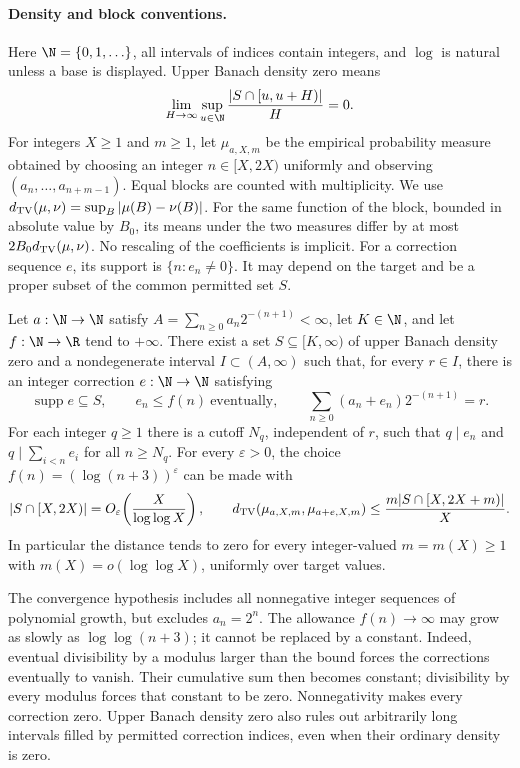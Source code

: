 \documentclass[11pt]{article}
\begin{document}
\paragraph{Density and block conventions.}
Here $\N=\{0,1,\ldots\}$, all intervals of indices contain integers, and
$\log$ is natural unless a base is displayed.  Upper Banach density zero means
\[
 \lim_{H\to\infty}\sup_{u\in\N}\frac{|S\cap[u,u+H)|}{H}=0.
\]
For integers $X\ge1$ and $m\ge1$, let $\mu_{a,X,m}$ be the empirical
probability measure obtained by choosing an integer $n\in[X,2X)$ uniformly
and observing $(a_n,\ldots,a_{n+m-1})$.  Equal blocks are counted with
multiplicity.
We use $d_{\rm TV}(\mu,\nu)=\sup_B|\mu(B)-\nu(B)|$.  For the same function
of the block, bounded in absolute value by $B_0$, its means under the two
measures differ by at most $2B_0d_{\rm TV}(\mu,\nu)$.
No rescaling of the coefficients is implicit.
For a correction sequence $e$, its support is $\{n:e_n\ne0\}$.
It may depend on the target and be a proper subset of the common permitted
set $S$.

\begin{proposition}\label{res:sparserationalisation}
Let $a:\N\to\N$ satisfy $A=\sum_{n\ge0}a_n2^{-(n+1)}<\infty$,
let $K\in\N$, and let $f:\N\to\R$ tend to $+\infty$.
There exist a set $S\subseteq[K,\infty)$ of upper Banach density zero
and a nondegenerate interval $I\subset(A,\infty)$ such that, for every
$r\in I$, there is an integer correction $e:\N\to\N$ satisfying
\[
 \operatorname{supp}e\subseteq S,\qquad e_n\le f(n)\ \text{eventually},
 \qquad \sum_{n\ge0}(a_n+e_n)2^{-(n+1)}=r.
\]
For each integer $q\ge1$ there is a cutoff $N_q$, independent of $r$,
such that $q\mid e_n$ and $q\mid\sum_{i<n}e_i$ for all $n\ge N_q$.
For every $\varepsilon>0$, the choice $f(n)=(\log(n+3))^\varepsilon$
can be made with
\[
 |S\cap[X,2X)|=O_\varepsilon\!\left(\frac{X}{\log\log X}\right),
 \qquad
 d_{\rm TV}(\mu_{a,X,m},\mu_{a+e,X,m})
 \le\frac{m|S\cap[X,2X+m)|}{X}.
\]
In particular the distance tends to zero for every integer-valued
$m=m(X)\ge1$ with $m(X)=o(\log\log X)$, uniformly over target values.
\end{proposition}

The convergence hypothesis includes all nonnegative integer sequences of
polynomial growth, but excludes $a_n=2^n$.  The allowance $f(n)\to\infty$
may grow as slowly as $\log\log(n+3)$; it cannot be replaced by a constant.
Indeed, eventual divisibility by a modulus larger than the bound forces
the corrections eventually to vanish.  Their cumulative sum then becomes
constant; divisibility by every modulus forces that constant to be zero.
Nonnegativity makes every correction zero.
Upper Banach density zero also rules out arbitrarily long intervals filled
by permitted correction indices, even when their ordinary density is zero.
\end{document}

